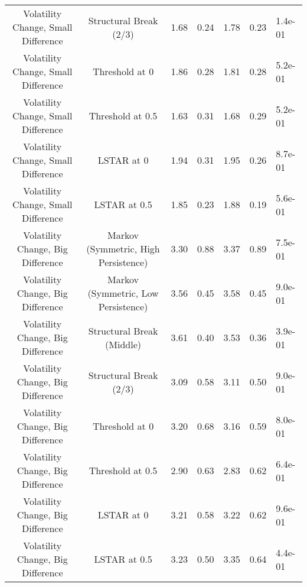 \begin{table}[t]
\begin{tabular*}{\linewidth}{@{\extracolsep{\fill}}ccrrrrl}
Volatility Change, Small Difference & Structural Break (2/3) & 1.68 & 0.24 & 1.78 & 0.23 & 1.4e-01 \\ 
Volatility Change, Small Difference & Threshold at 0 & 1.86 & 0.28 & 1.81 & 0.28 & 5.2e-01 \\ 
Volatility Change, Small Difference & Threshold at 0.5 & 1.63 & 0.31 & 1.68 & 0.29 & 5.2e-01 \\ 
Volatility Change, Small Difference & LSTAR at 0 & 1.94 & 0.31 & 1.95 & 0.26 & 8.7e-01 \\ 
Volatility Change, Small Difference & LSTAR at 0.5 & 1.85 & 0.23 & 1.88 & 0.19 & 5.6e-01 \\ 
Volatility Change, Big Difference & Markov (Symmetric, High Persistence) & 3.30 & 0.88 & 3.37 & 0.89 & 7.5e-01 \\ 
Volatility Change, Big Difference & Markov (Symmetric, Low Persistence) & 3.56 & 0.45 & 3.58 & 0.45 & 9.0e-01 \\ 
Volatility Change, Big Difference & Structural Break (Middle) & 3.61 & 0.40 & 3.53 & 0.36 & 3.9e-01 \\ 
Volatility Change, Big Difference & Structural Break (2/3) & 3.09 & 0.58 & 3.11 & 0.50 & 9.0e-01 \\ 
Volatility Change, Big Difference & Threshold at 0 & 3.20 & 0.68 & 3.16 & 0.59 & 8.0e-01 \\ 
Volatility Change, Big Difference & Threshold at 0.5 & 2.90 & 0.63 & 2.83 & 0.62 & 6.4e-01 \\ 
Volatility Change, Big Difference & LSTAR at 0 & 3.21 & 0.58 & 3.22 & 0.62 & 9.6e-01 \\ 
Volatility Change, Big Difference & LSTAR at 0.5 & 3.23 & 0.50 & 3.35 & 0.64 & 4.4e-01 \\ 
\bottomrule
\end{tabular*}
\end{table}

